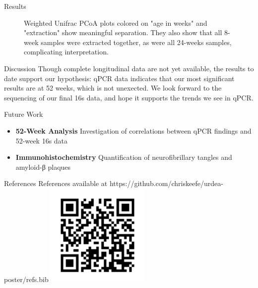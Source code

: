 \documentclass[final]{beamer}
\newlength{\colwidth}
\begin{document}
\begin{frame}[t]
\begin{columns}[t]
\begin{column}{\colwidth}
\begin{block}{Results}
\begin{figure}[!htb]
\begin{center}
        \end{center}
      \endminipage\hfill
      \caption{Weighted Unifrac PCoA plots colored on "age in weeks" and
      "extraction" show meaningful separation. They also show that all 8-week
      samples were extracted together, as were all 24-weeks samples,
      complicating interpretation.}
      \label{fig:qpcrResults}
    \end{figure}

  \end{block}

  \begin{block}{Discussion}
    Though complete longitudinal data are not yet available, the results
    to date support our hypothesis: qPCR data indicates that our most
    significant results are at 52 weeks, which is not unexected. We look
    forward to the sequencing of our final 16s data, and hope it supports the
    trends we see in qPCR.
  \end{block}

  \begin{block}{Future Work}

    \begin{itemize}
      \item \textbf{52-Week Analysis} Investigation of correlations between qPCR findings and 52-week 16s data
      \item \textbf{Immunohistochemistry} Quantification of neurofibrillary tangles and amyloid-β plaques
    \end{itemize}

  \end{block}

  \begin{block}{References}
    References available at https://github.com/chriskeefe/urdea-poster/refs.bib
    \includegraphics[height=5cm]{assets/repo}


\end{block}
\end{column}
\end{columns}
\end{frame}
\end{document}
